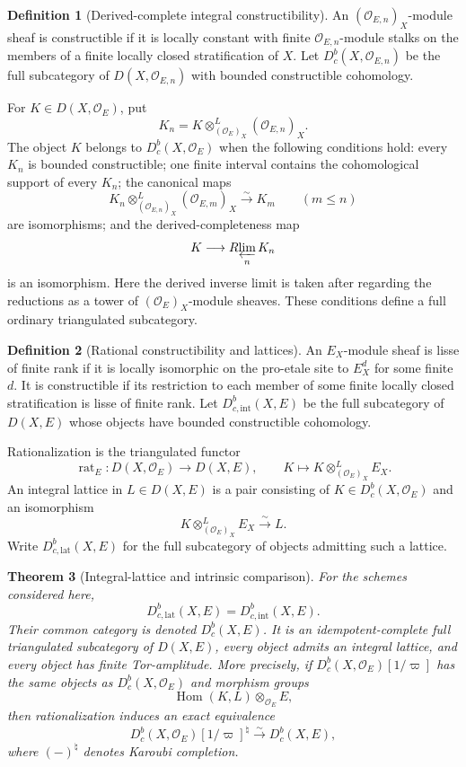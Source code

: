 \documentclass[10pt]{article}
\newtheorem{theorem}{Theorem}[section]
\theoremstyle{definition}
\newtheorem{definition}[theorem]{Definition}
\newcommand{\Dbc}{D^b_c}
\newcommand{\Dbcint}{D^b_{c,\mathrm{int}}}
\newcommand{\Dbclat}{D^b_{c,\mathrm{lat}}}
\begin{document}
\begin{definition}[Derived-complete integral constructibility]
An \((\mathcal O_{E,n})_X\)-module sheaf is constructible if it is locally
constant with finite \(\mathcal O_{E,n}\)-module stalks on the members of a
finite locally closed stratification of \(X\).  Let
\(\Dbc(X,\mathcal O_{E,n})\) be the full subcategory of
\(D(X,\mathcal O_{E,n})\) with bounded constructible cohomology.

For \(K\in D(X,\mathcal O_E)\), put
\[
 K_n=K\otimes^L_{(\mathcal O_E)_X}(\mathcal O_{E,n})_X.
\]
The object \(K\) belongs to \(\Dbc(X,\mathcal O_E)\) when the following
conditions hold: every \(K_n\) is bounded constructible; one finite interval
contains the cohomological support of every \(K_n\); the canonical maps
\[
 K_n\otimes^L_{(\mathcal O_{E,n})_X}(\mathcal O_{E,m})_X
       \xrightarrow{\sim}K_m\qquad(m\le n)
\]
are isomorphisms; and the derived-completeness map
\[
                         K\longrightarrow R\!\varprojlim_nK_n
\]
is an isomorphism.  Here the derived inverse limit is taken after regarding
the reductions as a tower of \((\mathcal O_E)_X\)-module sheaves.  These
conditions define a full ordinary triangulated subcategory.
\end{definition}

\begin{definition}[Rational constructibility and lattices]
An \(E_X\)-module sheaf is lisse of finite rank if it is locally isomorphic
on the pro-etale site to \(E_X^d\) for some finite \(d\).  It is
constructible if its restriction to each member of some finite locally
closed stratification is lisse of finite rank.  Let
\(\Dbcint(X,E)\) be the full subcategory of \(D(X,E)\) whose
objects have bounded constructible cohomology.

Rationalization is the triangulated functor
\[
 \operatorname{rat}_E:D(X,\mathcal O_E)\longrightarrow D(X,E),
 \qquad K\longmapsto K\otimes^L_{(\mathcal O_E)_X}E_X.
\]
An integral lattice in \(L\in D(X,E)\) is a pair consisting of
\(K\in\Dbc(X,\mathcal O_E)\) and an isomorphism
\[
                 K\otimes^L_{(\mathcal O_E)_X}E_X\xrightarrow{\sim}L.
\]
Write \(\Dbclat(X,E)\) for the full subcategory of objects
admitting such a lattice.
\end{definition}

\begin{theorem}[Integral-lattice and intrinsic comparison]
For the schemes considered here,
\[
       \Dbclat(X,E)=\Dbcint(X,E).
\]
Their common category is denoted \(\Dbc(X,E)\).  It is an
idempotent-complete full triangulated subcategory of \(D(X,E)\), every
object admits an integral lattice, and every object has finite
Tor-amplitude.  More precisely, if \(\Dbc(X,\mathcal O_E)[1/\varpi]\) has
the same objects as \(\Dbc(X,\mathcal O_E)\) and morphism groups
\[
 \operatorname{Hom}(K,L)\otimes_{\mathcal O_E}E,
\]
then rationalization induces an exact equivalence
\[
 \Dbc(X,\mathcal O_E)[1/\varpi]^{\natural}
       \xrightarrow{\sim}\Dbc(X,E),
\]
where \((-)^{\natural}\) denotes Karoubi completion.
\end{theorem}
\end{document}
